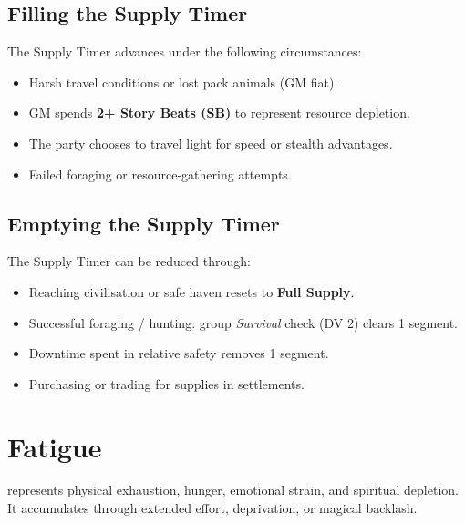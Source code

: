 \subsection{Filling the Supply Timer }\label{subsec:filling_supply}

The Supply Timer advances under the following circumstances:
\begin{itemize}
    \item Harsh travel conditions or lost pack animals (GM fiat).
    \item GM spends \textbf{2+ Story Beats (SB)} to represent resource depletion.
    \item The party chooses to travel light for speed or stealth advantages.
    \item Failed foraging or resource‑gathering attempts.
\end{itemize}

\subsection{Emptying the Supply Timer }\label{subsec:emptying_supply}

The Supply Timer can be reduced through:
\begin{itemize}
    \item Reaching civilisation or safe haven resets to \textbf{Full Supply}.
    \item Successful foraging / hunting: group \emph{Survival} check (DV 2) clears 1 segment.
    \item Downtime spent in relative safety removes 1 segment.
    \item Purchasing or trading for supplies in settlements.
\end{itemize}

\section{Fatigue}\label{sec:fatigue}

 represents physical exhaustion, hunger, emotional strain, and spiritual depletion. It accumulates through extended effort, deprivation, or magical backlash.

